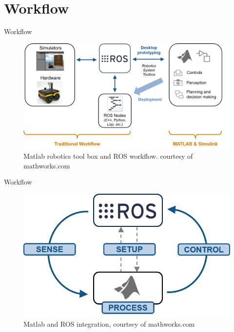 \documentclass{beamer}
\begin{document}
\section{Workflow}
\begin{frame}{Workflow}

\begin{figure}[1]

\includegraphics[scale=0.3]{figs/img/matlabworkflow.png}
\caption{Matlab robotics tool box and ROS workflow. courtesy of mathworks.com}
\end{figure}
\end{frame}
\begin{frame}{Workflow}
\begin{figure}
\includegraphics[scale=0.5]{figs/img/matlabros.png}
\caption{Matlab and ROS integration, courtsey of mathworks.com}
\end{figure}

\end{frame}
\end{document}
